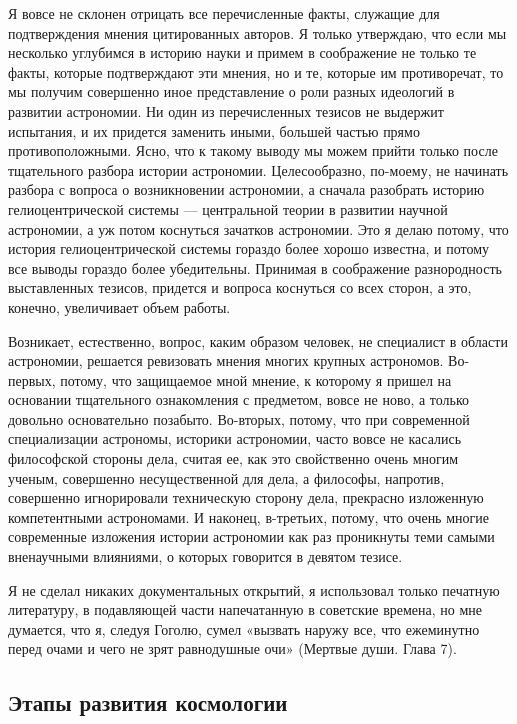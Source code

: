 Я  вовсе не  склонен отрицать  все перечисленные  факты, служащие  для
подтверждения  мнения цитированных  авторов. Я  только утверждаю,  что
если мы несколько углубимся в историю  науки и примем в соображение не
только те факты, которые подтверждают эти  мнения, но и те, которые им
противоречат,  то  мы получим  совершенно  иное  представление о  роли
разных  идеологий  в развитии  астрономии.  Ни  один из  перечисленных
тезисов  не   выдержит  испытания,  и  их   придется  заменить  иными,
большей частью  прямо противоположными. Ясно,  что к такому  выводу мы
можем  прийти только  после  тщательного  разбора истории  астрономии.
Целесообразно, по-моему, не начинать разбора с вопроса о возникновении
астрономии, а сначала разобрать  историю гелиоцентрической системы ---
центральной теории в развитии научной астрономии, а уж потом коснуться
зачатков астрономии. Это я делаю потому, что история гелиоцентрической
системы гораздо  более хорошо  известна, и  потому все  выводы гораздо
более убедительны.  Принимая в соображение  разнородность выставленных
тезисов, придется и вопроса коснуться  со всех сторон, а это, конечно,
увеличивает объем работы.

Возникает, естественно,  вопрос, каким образом человек,  не специалист
в  области  астрономии,  решается  ревизовать  мнения  многих  крупных
астрономов. Во-первых, потому, что  защищаемое мной мнение, к которому
я пришел на  основании тщательного ознакомления с  предметом, вовсе не
ново, а только довольно  основательно позабыто. Во-вторых, потому, что
при  современной специализации  астрономы, историки  астрономии, часто
вовсе  не  касались  философской  стороны дела,  считая  ее,  как  это
свойственно очень многим ученым, совершенно несущественной для дела, а
философы, напротив, совершенно  игнорировали техническую сторону дела,
прекрасно изложенную компетентными  астрономами. И наконец, в-третьих,
потому, что очень многие  современные изложения истории астрономии как
раз проникнуты теми самыми  вненаучными влияниями, о которых говорится
в девятом тезисе.

Я  не сделал  никаких  документальных открытий,  я использовал  только
печатную  литературу, в  подавляющей  части  напечатанную в  советские
времена, но мне думается, что  я, следуя Гоголю, сумел «вызвать наружу
все,  что ежеминутно  перед  очами  и чего  не  зрят равнодушные  очи»
(Мертвые души. Глава 7).

\subsection{Этапы развития космологии}

